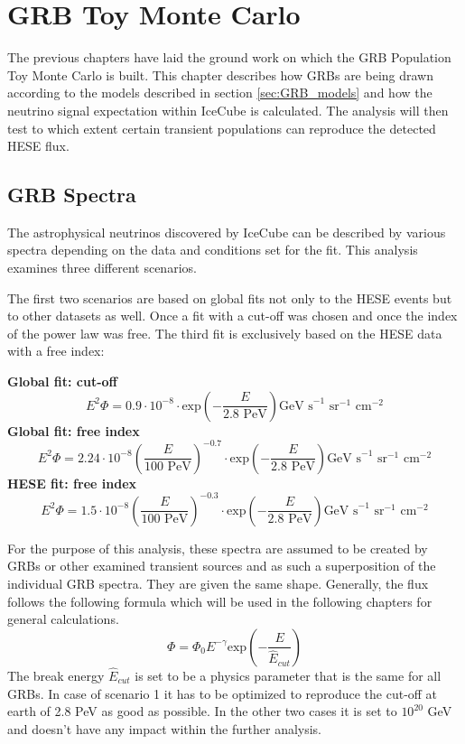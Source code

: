 \section{GRB Toy Monte Carlo}
\label{sec:GRBTMC}
The previous chapters have laid the ground work on which the GRB Population Toy
Monte Carlo is built. This chapter describes how GRBs are being drawn according
to the models described in section 
\ref{sec:GRB_models}
 and how the neutrino signal expectation
within IceCube is calculated. The analysis will then test to which extent 
certain transient populations can reproduce the detected HESE flux. 

\subsection{GRB Spectra}
\label{sec:GRBSpectra}
The astrophysical neutrinos discovered by IceCube can be described by various
spectra depending on the data and conditions set for the fit. This
analysis examines three different scenarios.

The first two scenarios are based on global fits not only to the HESE events but
to other datasets as well. Once a fit with a cut-off was chosen and once the
index of the power law was free. The third fit is exclusively based on the HESE
data with a free index:

{\bf Global fit: cut-off}
\begin{equation}
 E^2 \Phi = 0.9 \cdot 10^{-8} \cdot \text{exp}\left(-\frac{E}{2.8 \text{ PeV}}
\right) \text{GeV s}^{-1} \text{ sr}^{-1} \text{ cm}^{-2}
\end{equation}
{\bf Global fit: free index}
\begin{equation}
 E^2 \Phi = 2.24 \cdot 10^{-8} \left(\frac{E}{100 \text{ PeV}} \right)^{-0.7}
\cdot \text{exp}\left(-\frac{E}{2.8 \text{ PeV}}
\right) \text{GeV s}^{-1} \text{ sr}^{-1} \text{ cm}^{-2}
\end{equation}
{\bf HESE fit: free index}
\begin{equation}
 E^2 \Phi = 1.5 \cdot 10^{-8} \left(\frac{E}{100 \text{ PeV}} \right)^{-0.3}
\cdot \text{exp}\left(-\frac{E}{2.8 \text{ PeV}}
\right) \text{GeV s}^{-1} \text{ sr}^{-1} \text{ cm}^{-2}
\end{equation}

For the purpose of this analysis, these spectra are assumed to be created by
GRBs or other examined transient sources and as such a superposition of the
individual GRB spectra. They are given the same shape.
Generally, the flux follows the following formula which will be used in the
following chapters for general calculations.
\begin{equation}
\label{eq:HESEflux_gen}
 \Phi = \Phi_0 E^{-\gamma} \text{exp} \left(-\frac{E}{\hat{E}_{cut}} \right)
\end{equation}
The break energy $\hat{E}_{cut}$ is set to be a physics parameter that is the
same for all GRBs. In case of scenario 1 it has to be optimized to reproduce
the cut-off at earth of 2.8 PeV as good as possible. In the other two cases it
is set to $10^{20}$ GeV and doesn't have any impact within the further analysis.










